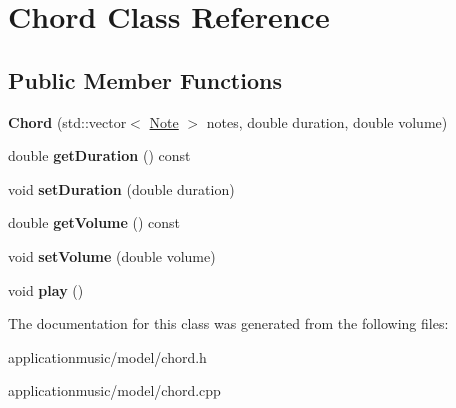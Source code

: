 \hypertarget{class_chord}{\section{Chord Class Reference}
\label{class_chord}
}
\subsection*{Public Member Functions}
\begin{DoxyCompactItemize}
\item 
\hypertarget{class_chord_af662a96e956354ec9c37980546bcd133}{{\bfseries Chord} (std\-::vector$<$ \hyperlink{class_note}{Note} $>$ notes, double duration, double volume)}\label{class_chord_af662a96e956354ec9c37980546bcd133}

\item 
\hypertarget{class_chord_a1354afa1c0651647de48e47a2c9575f6}{double {\bfseries get\-Duration} () const }\label{class_chord_a1354afa1c0651647de48e47a2c9575f6}

\item 
\hypertarget{class_chord_a375d61538651858dd78698d62de2901b}{void {\bfseries set\-Duration} (double duration)}\label{class_chord_a375d61538651858dd78698d62de2901b}

\item 
\hypertarget{class_chord_a6aa66a8c71c77105119d81010a018bc5}{double {\bfseries get\-Volume} () const }\label{class_chord_a6aa66a8c71c77105119d81010a018bc5}

\item 
\hypertarget{class_chord_a2a7fbd2d39c0e2180123cb1edadf4b25}{void {\bfseries set\-Volume} (double volume)}\label{class_chord_a2a7fbd2d39c0e2180123cb1edadf4b25}

\item 
\hypertarget{class_chord_af003cd409e691665f4f366151bb6a288}{void {\bfseries play} ()}\label{class_chord_af003cd409e691665f4f366151bb6a288}

\end{DoxyCompactItemize}


The documentation for this class was generated from the following files\-:\begin{DoxyCompactItemize}
\item 
applicationmusic/model/chord.\-h\item 
applicationmusic/model/chord.\-cpp\end{DoxyCompactItemize}
